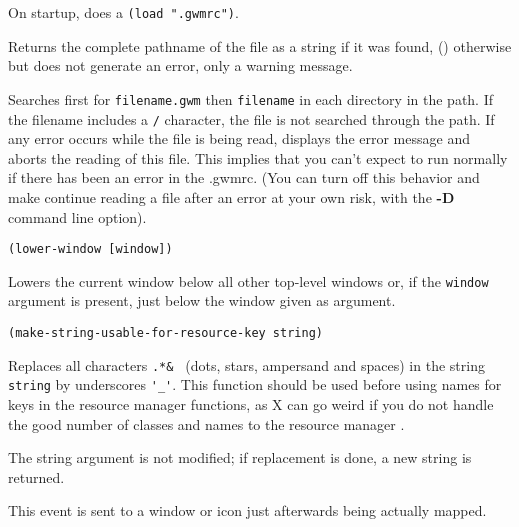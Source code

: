 On startup, {\GWM} does a \verb|(load ".gwmrc")|.

Returns the complete pathname of the file as a string if it was found, ()
otherwise but does not generate an error, only a warning message.

Searches first for \verb"filename.gwm" then \verb"filename" in each
directory in the path. If the filename includes a \verb"/" character, the
file is not searched through the path. If any error occurs while the file is
being read, {\WOOL} displays the error message and aborts the reading of
this file. This implies that you can't expect {\GWM} to run normally if
there has been an error in the .gwmrc. (You can turn off this behavior and
make {\GWM} continue reading a file after an error at your own risk, with
the {\bf -D} command line option).

        
{\usagefont\begin{verbatim}
(lower-window [window])
\end{verbatim}}\usageupspace

Lowers  the current window below all other top-level windows or, if the
\verb"window" argument is present, just below the window given as argument.


{\usagefont\begin{verbatim}
(make-string-usable-for-resource-key string)
\end{verbatim}}\usageupspace

Replaces all characters \verb*|.*& | (dots, stars, ampersand and spaces) in
the string
\verb"string" by underscores \verb"'_'". This function should be used
before using names for keys in the resource manager functions, as X
can go weird if you do not handle the good number of classes and names
to the resource manager .

The string argument is not modified; if replacement is done, a new
string is returned.



This event is sent to a window or icon just afterwards being actually mapped.


